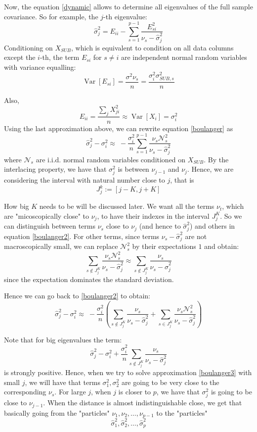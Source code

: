 \documentclass[12pt]{amsart}
\theoremstyle{definition}
\DeclareMathOperator{\Var}{Var}
\numberwithin{equation}{section}
\numberwithin{equation}{section}
\theoremstyle{remark}
\numberwithin{equation}{section}
\begin{document}
Now, the equation \ref{dynamic} allows to determine all eigenvalues of the full sample covariance. So for example, the $j$-th eigenvalue:
 		\begin{equation}
 			\label{boulanger}
 			\hat{\sigma}^2_j=E_{ii}-\sum_{s=1}^{p-1} \frac{E_{si}^2}{\nu_s-\hat{\sigma}^2_j}
 				\end{equation}
Conditioning on $X_{SUB}$, which is equivalent to condition on all data columns except the $i$-th, the term $E_{si}$ for $s \neq i$ are independent normal random variables with variance equalling:
 			$$ \Var[E_{si}]=\frac{\sigma^2\nu_s}{n}=\frac{\sigma^2_{i}\sigma^2_{SUB,s}}{n} $$
 			
Also,
 			$$E_{ii}=\frac{\sum_j X^2_{ji}}{n}\approx \Var[X_i]=\sigma_i^2$$
Using the last approximation above, we can rewrite equation \ref{boulanger} as
 			\begin{equation}
 			\label{boulanger2}
 			\hat{\sigma}^2_j-\sigma^2_i\approx \; -\frac{\sigma^2_i}{n}\sum_{s=1}^{p-1} \frac{\nu_s\mathcal{N}^2_{s}}{\nu_s-\hat{\sigma}^2_j}
 			\end{equation}
where $\mathcal{N}_s$ are i.i.d. normal random variables conditioned on $X_{SUB}$. By the interlacing property, we have that $\sigma^2_j$ is between $\nu_{j-1}$ and $\nu_j$. Hence, we are considering the interval with natural number close to $j$, that is
 			$$J^k_j:=[j-K,j+K]$$

How big $K$ needs to be will be discussed later. We want all the terms $\nu_t$, which are "micoscopically close" to $\nu_j$, to have their indexes in the interval $J^K_j$. So we can distinguish between terms $\nu_s$ close to $\nu_j$ (and hence to $\hat{\sigma}^2_j$) and others in equation \ref{boulanger2}. For other terms, since terms $\nu_s-\hat{\sigma}^2_j$ are not macroscopically small, we can replace $\mathcal{N}^2_s$ by their expectations $1$ and obtain:
 			$$\sum_{s\notin J^K_j} \frac{\nu_s\mathcal{N}^2_s}{\nu_s-\hat{\sigma}^2_j}\approx
 			\sum_{s\notin J^K_j} \frac{\nu_s}{\nu_s-\hat{\sigma}^2_j}$$
since the expectation dominates the standard deviation.

 Hence we can go back to \ref{boulanger2} to obtain:
 \begin{equation}
 \label{boulanger3}
 \hat{\sigma}^2_j-\sigma^2_i\approx \; -\frac{\sigma^2_i}{n}
 \left(\sum_{s\notin J^K_j} \frac{\nu_s}{\nu_s-\hat{\sigma}^2_j}
 +\sum_{s\in J^K_j} \frac{\nu_s\mathcal{N}^2_{s}}{\nu_s-\hat{\sigma}^2_j}
 \right)
 \end{equation}

 Note that for big eigenvalues the term:
 $$\hat{\sigma}^2_j-\sigma^2_i+\frac{\sigma^2_i}{n}
 \sum_{s\notin J^K_j} \frac{\nu_s}{\nu_s-\hat{\sigma}^2_j}$$ is strongly positive. Hence, when we try to solve approximation \ref{boulanger3} with small $j$, we will have that terms $\sigma^2_1, \sigma^2_2$ are going to be very close to the corresponding $\nu_s$. For large $j$, when $j$ is closer to $p$, we have that $\sigma^2_j$ is going to be close to $\nu_{j-1}$. When the distance is almost indistinguishable close, we get that basically going from the "particles" $\nu_1,\nu_2,\ldots,\nu_{p-1}$ to the "particles"
 $$\hat{\sigma}_1^2,\hat{\sigma}_2^2,\ldots,\hat{\sigma}^2_p$$
\end{document}
